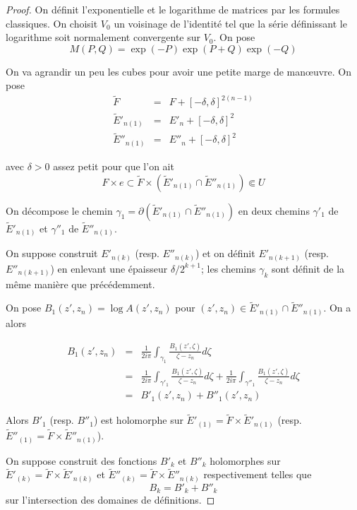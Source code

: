 \documentclass{article}
\theoremstyle{definition}
\theoremstyle{remark}
\begin{document}
\begin{proof}
On définit l'exponentielle et le logarithme de matrices par les formules classiques. On choisit $V_0$ un voisinage de l'identité tel que la série définissant le logarithme soit normalement convergente sur $V_0$. On pose
$$M(P, Q) =  \exp(-P)\exp(P+Q)\exp(-Q)$$

On va agrandir un peu les cubes pour avoir une petite marge de manœuvre. On pose
\begin{eqnarray}
\nonumber \tilde{F} &=& F + [-\delta,\delta]^{2(n-1)} \\
\nonumber \tilde{E}'_{n(1)} &=& E'_n + [-\delta,\delta]^2 \\
\nonumber \tilde{E}''_{n(1)} &=& E''_n + [-\delta,\delta]^2
\end{eqnarray}

avec $\delta > 0$ assez petit pour que l'on ait
$$F \times e \subset \tilde{F} \times (\tilde{E}'_{n(1)} \cap \tilde{E}''_{n(1)}) \Subset U$$

On décompose le chemin $\gamma_1 = \partial(\tilde{E}'_{n(1)} \cap \tilde{E}''_{n(1)})$ en deux chemins $\gamma'_1$ de $\tilde{E}'_{n(1)}$ et $\gamma''_1$ de $\tilde{E}''_{n(1)}$.

On suppose construit $E'_{n(k)}$ (resp. $E''_{n(k)}$) et on définit $E'_{n(k+1)}$ (resp. $E''_{n(k+1)}$) en enlevant une épaisseur $\delta/2^{k+1}$; les chemins $\gamma_k$ sont définit de la même manière que précédemment.

On pose $B_1(z', z_n)=\log A(z',z_n)$ pour $(z', z_n) \in \tilde{E}'_{n(1)} \cap \tilde{E}''_{n(1)}$. On a alors

\begin{eqnarray}
\nonumber B_1(z', z_n) &=& \frac{1}{2i\pi} \int_{\gamma_{1}} \frac{B_1(z', \zeta)}{\zeta - z_n} d\zeta \\
\nonumber &=& \frac{1}{2i\pi} \int_{\gamma'_{1}} \frac{B_1(z', \zeta)}{\zeta - z_n} d\zeta + \frac{1}{2i\pi} \int_{\gamma''_{1}} \frac{B_1(z', \zeta)}{\zeta - z_n} d\zeta \\
\nonumber &=& B'_1(z', z_n) + B''_1(z', z_n)
\end{eqnarray}

Alors $B'_1$ (resp. $B''_1$) est holomorphe sur $\tilde{E}'_{(1)}=\tilde{F} \times \tilde{E}'_{n(1)}$ (resp. $\tilde{E}''_{(1)}=\tilde{F} \times \tilde{E}''_{n(1)}$).

On suppose construit des fonctions $B'_k$ et $B''_k$ holomorphes sur $\tilde{E}'_{(k)}=\tilde{F} \times \tilde{E}'_{n(k)}$ et $\tilde{E}''_{(k)}=\tilde{F} \times \tilde{E}''_{n(k)}$ respectivement telles que $$B_k = B'_k + B''_k$$
sur l'intersection des domaines de définitions.


\end{proof}
\end{document}
